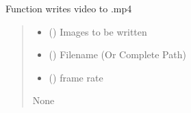 \documentclass[letterpaper,10pt,english]{sphinxmanual}
\begin{document}
\begin{fulllineitems}
\label{\detokenize{CalSciPy.io:CalSciPy.io.save_video}}
\pysigstartsignatures
{}
\pysigstopsignatures
\sphinxAtStartPar
Function writes video to .mp4
\begin{quote}\begin{description}
\begin{itemize}
\item {} 
\sphinxAtStartPar
{} () \sphinxhyphen{}\sphinxhyphen{} Images to be written

\item {} 
\sphinxAtStartPar
{} (\sphinxstyleliteralemphasis{\sphinxupquote{{[}}}\sphinxstyleliteralemphasis{\sphinxupquote{, }}\sphinxstyleliteralemphasis{\sphinxupquote{{]}}}) \sphinxhyphen{}\sphinxhyphen{} Filename  (Or Complete Path)

\item {} 
\sphinxAtStartPar
{} (\sphinxstyleliteralemphasis{\sphinxupquote{{[}}}\sphinxstyleliteralemphasis{\sphinxupquote{, }}\sphinxstyleliteralemphasis{\sphinxupquote{{]}}}) \sphinxhyphen{}\sphinxhyphen{} frame rate

\end{itemize}

\sphinxAtStartPar
None

\end{description}\end{quote}

\end{fulllineitems}
\end{document}
